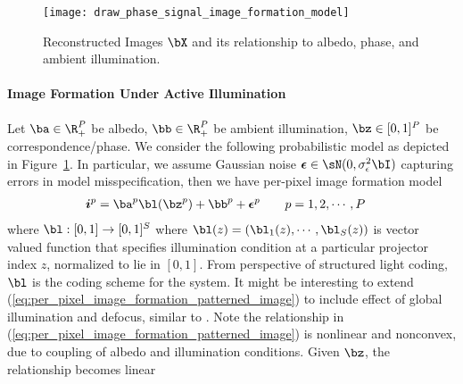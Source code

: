 \documentclass[../writeup.tex]{subfiles}
\begin{document}
\begin{figure}[h!]
    \begin{center}
        \texttt{[image: draw\_phase\_signal\_image\_formation\_model]}
        \caption{Reconstructed Images $\bX$ and its relationship to albedo, phase, and ambient illumination.}
        \label{fig:draw_phase_signal_image_formation_model}
    \end{center}
\end{figure}  

\paragraph{Image Formation Under Active Illumination}

Let $\ba \in \R_+^{P}$ be albedo, $\bb\in\R_+^P$ be ambient illumination, $\bz\in[0,1]^{P}$ be correspondence/phase. We consider the following probabilistic model as depicted in Figure~\ref{fig:draw_phase_signal_image_formation_model}. In particular, we assume Gaussian noise $\bepsilon\in\sN(0,\sigma^2_{\epsilon}\bI)$ capturing errors in model misspecification, then we have per-pixel image formation model
\begin{align}
    \si^p
        &= \ba^p \bl(\bz^p) + \bb^p + \bepsilon^p
        \qquad
        p = 1,2,\cdots,P
    \label{eq:per_pixel_image_formation_patterned_image}
\end{align}
where $\bl:[0,1]\to [0,1]^S$ where $\bl(z) = (\bl_1(z),\cdots,\bl_S(z))$ is vector valued function that specifies illumination condition at a particular projector index $z$, normalized to lie in $[0,1]$. From perspective of structured light coding, $\bl$ is the coding scheme for the system. It might be interesting to extend (\ref{eq:per_pixel_image_formation_patterned_image}) to include effect of global illumination and defocus, similar to \cite{guptaMicroPhaseShifting2012}. Note the relationship in (\ref{eq:per_pixel_image_formation_patterned_image}) is nonlinear and nonconvex, due to coupling of albedo and illumination conditions. Given $\bz$, the relationship becomes linear
\end{document}
